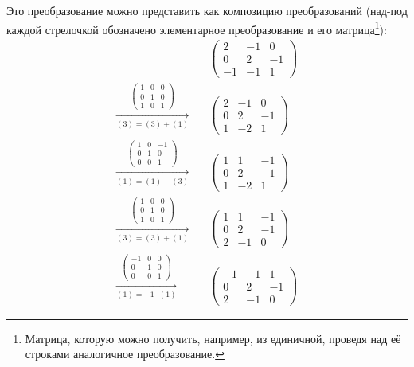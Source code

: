 \documentclass[a4paper,12pt]{article}
\begin{document}
\begin{solution}
    Это преобразование можно представить как композицию преобразований (над-под каждой стрелочкой обозначено элементарное преобразование и его матрица\footnote{Матрица, которую можно получить, например, из единичной, проведя над её строками аналогичное преобразование.}):
    \begin{equation*}
    \begin{split}
      &\begin{pmatrix}
        2 & -1 & 0\\
        0 & 2 & -1\\
        -1 & -1 & 1
      \end{pmatrix}\\
      \xrightarrow[(3) = (3) + (1)]{\left(\begin{smallmatrix}1 & 0 & 0\\0 & 1 & 0\\1 & 0 & 1\end{smallmatrix}\right)}\quad &\begin{pmatrix}
          2 & -1 & 0\\
          0 & 2 & -1\\
          1 & -2 & 1
        \end{pmatrix}\\
      \xrightarrow[(1) = (1) - (3)]{\left(\begin{smallmatrix}1 & 0 & -1\\0 & 1 & 0\\0 & 0 & 1\end{smallmatrix}\right)}\quad &\begin{pmatrix}
          1 & 1 & -1\\
          0 & 2 & -1\\
          1 & -2 & 1
        \end{pmatrix}\\
      \xrightarrow[(3) = (3) + (1)]{\left(\begin{smallmatrix}1 & 0 & 0\\0 & 1 & 0\\1 & 0 & 1\end{smallmatrix}\right)}\quad &\begin{pmatrix}
          1 & 1 & -1\\
          0 & 2 & -1\\
          2 & -1 & 0
        \end{pmatrix}\\
      \xrightarrow[(1) = -1 \cdot (1)]{\left(\begin{smallmatrix}-1 & 0 & 0\\0 & 1 & 0\\0 & 0 & 1\end{smallmatrix}\right)}\quad &\begin{pmatrix}
          -1 & -1 & 1\\
          0 & 2 & -1\\
          2 & -1 & 0
        \end{pmatrix}
    \end{split}
    \end{equation*}
    

\end{solution}
\end{document}
